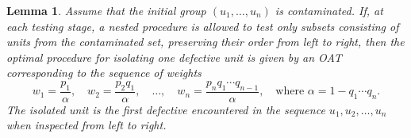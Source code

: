 \documentclass[12pt]{article}
\newtheorem{lem}{Lemma}
\begin{document}
\begin{lem}\label{l:single_defective_proc_as_OAT}
Assume that the initial group $(u_1, \dots, u_n)$ is contaminated. If, at each testing stage, a nested procedure is allowed to test only subsets consisting of units from the contaminated set, preserving their order from left to right, then the optimal procedure for isolating one defective unit is given by an OAT corresponding to the sequence of weights
\[
w_1 = \frac{p_1}{\alpha}, \quad w_2 = \frac{p_2 q_1}{\alpha}, \quad \dots, \quad w_n = \frac{p_n q_1 \cdots q_{n-1}}{\alpha}, \quad \text{where } \alpha = 1 - q_1 \cdots q_n.
\]
The isolated unit is the first defective encountered in the sequence $u_1, u_2, \dots, u_n$ when inspected from left to right.
\end{lem}
\end{document}
